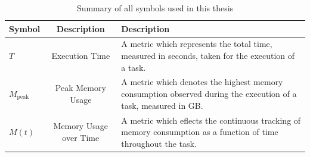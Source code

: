 
\newcommand{\T}{$T$}
\newcommand{\Mpeak}{$M_{\text{peak}}$}
\newcommand{\Mt}{$M(t)$}

\begin{table}[h]
    \centering
    \begin{tabular}{|l|c|p{5cm}|}
        \hline
        \textbf{Symbol} & \textbf{Description}   & \textbf{Description}                                                                                                \\ \hline
        \T              & Execution Time         & A metric which represents the total time, measured in seconds, taken for the execution of a task.                   \\ \hline
        \Mpeak          & Peak Memory Usage      & A metric which denotes the highest memory consumption observed during the execution of a task, measured in \ac{GB}. \\ \hline
        \Mt             & Memory Usage over Time & A metric which eflects the continuous tracking of memory consumption as a function of time throughout the task.     \\ \hline
    \end{tabular}
    \caption{Summary of all symbols used in this thesis }
    \label{tab:summary-of-symbols}
\end{table}